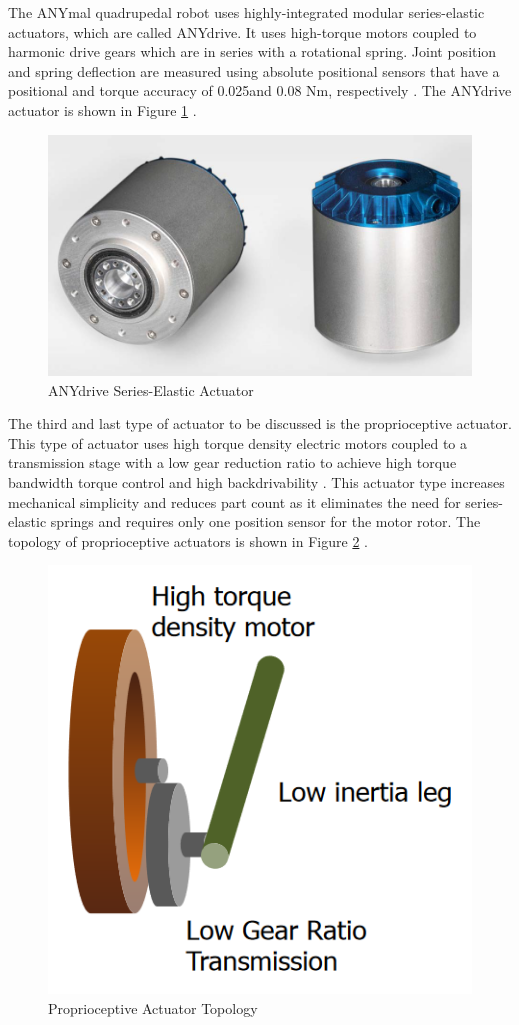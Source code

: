 \documentclass[english]{upeeei}
\begin{document}
The ANYmal quadrupedal robot uses highly-integrated modular series-elastic actuators, which are called ANYdrive. It uses high-torque motors coupled to harmonic drive gears which are in series with a rotational spring. Joint position and spring deflection are measured using absolute positional sensors that have a positional and torque accuracy of 0.025\textdegree and 0.08 Nm, respectively \cite{anymal2}. The ANYdrive actuator is shown in Figure \ref{fig:anydrive} \cite{anymal2}.

\begin{figure}[H]
\begin{centering}
\includegraphics[width=0.4\columnwidth]{images/anydrive}
\par\end{centering}
\caption{ANYdrive Series-Elastic Actuator\label{fig:anydrive}}
\end{figure}

The third and last type of actuator to be discussed is the proprioceptive actuator. This type of actuator uses high torque density electric motors coupled to a transmission stage with a low gear reduction ratio to achieve high torque bandwidth torque control and high backdrivability \cite{minicheetah, cheetah3actuator}. This actuator type increases mechanical simplicity and reduces part count as it eliminates the need for series-elastic springs and requires only one position sensor for the motor rotor. The topology of proprioceptive actuators is shown in Figure \ref{fig:proprioceptive-actuator} \cite{cheetah3actuator}.

\begin{figure}[H]
\begin{centering}
\includegraphics[width=0.3\columnwidth]{images/proprioceptive}
\par\end{centering}
\caption{Proprioceptive Actuator Topology\label{fig:proprioceptive-actuator}}
\end{figure}
\end{document}

